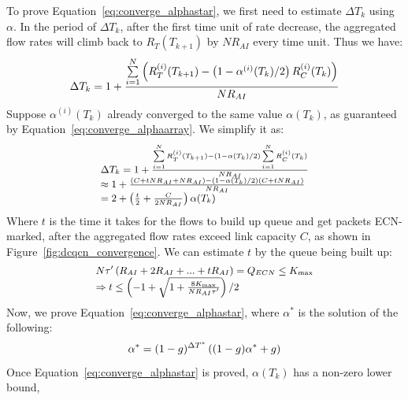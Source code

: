 To prove Equation~\ref{eq:converge_alphastar}, we first need to estimate $\Delta T_k$
using $\alpha$. In the period of $\Delta T_k$, after the first time unit of rate
decrease, the aggregated flow rates will climb back to $R_T(T_{k+1})$ by
$NR_{AI}$ every time unit.  Thus we have:
\begin{equation}
\small\Delta {T_k} = 1 + \frac{{\sum\limits_{i = 1}^N {\left( {R_T^{(i)}({T_{k + 1}}) - \left( {1 - {\alpha ^{(i)}}({T_k})/2} \right)R_C^{(i)}({T_k})} \right)} }}{{N{R_{AI}}}}
\end{equation}
Suppose $\alpha^{(i)}({T_k})$ already converged to the same value $\alpha ({T_k})$, as guaranteed by
Equation~\ref{eq:converge_alphaarray}. We simplify it as:
\begin{equation}
\small
\begin{array}{l}
\Delta {T_k} = 1 + \frac{{\sum\limits_{i = 1}^N {R_T^{(i)}({T_{k + 1}})}  - \left( {1 - \alpha ({T_k})/2} \right)\sum\limits_{i = 1}^N {R_C^{(i)}({T_k})} }}{{N{R_{AI}}}}\\
 \approx 1 + \frac{{\left( {C + tN{R_{AI}} + N{R_{AI}}} \right) - \left( {1 - \alpha ({T_k})/2} \right)\left( {C + tN{R_{AI}}} \right)}}{{N{R_{AI}}}}\\
 = 2 + \left( {\frac{t}{2} + \frac{C}{{2N{R_{AI}}}}} \right)\alpha ({T_k})
\end{array}
\label{eq:converge_tk}
\end{equation}
Where $t$ is the time it takes for the flows to build up queue and get packets ECN-marked, after
the aggregated flow rates exceed link capacity $C$, as shown in Figure~\ref{fig:dcqcn_convergence}.
We can estimate $t$ by the queue being built up:
\begin{equation}
\small
\begin{array}{l}
N\tau '\left( {{R_{AI}} + 2{R_{AI}} + ... + t{R_{AI}}} \right) = {Q_{ECN}} \le {K_{\max }}\\
 \Rightarrow t \le \left( { - 1 + \sqrt {1 + \frac{{8{K_{\max }}}}{{N{R_{AI}}\tau '}}} } \right)/2
\end{array}
\end{equation}
Now, we prove Equation~\ref{eq:converge_alphastar}, where $\alpha^*$ is the solution of the following:
\begin{equation}
\small
{\alpha ^*} = {(1 - g)^{\Delta {T^*}}}\left( {(1 - g){\alpha ^*} + g} \right)
\end{equation}
Once Equation~\ref{eq:converge_alphastar} is proved, $\alpha ({T_k})$ has a non-zero lower bound, 

